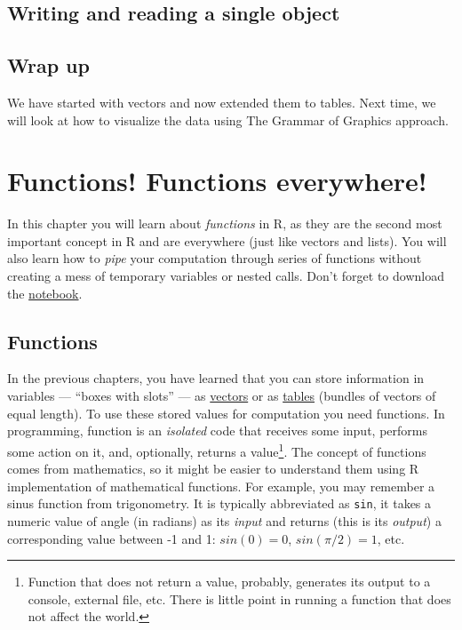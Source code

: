 \documentclass[
]{book}
\begin{document}
\hypertarget{rds}{%
\section{Writing and reading a single object}\label{rds}}

\hypertarget{wrap-up-1}{%
\section{Wrap up}\label{wrap-up-1}}

We have started with vectors and now extended them to tables. Next time, we will look at how to visualize the data using The Grammar of Graphics approach.

\hypertarget{functions}{%
\chapter{Functions! Functions everywhere!}\label{functions}}

In this chapter you will learn about \emph{functions} in R, as they are the second most important concept in R and are everywhere (just like vectors and lists). You will also learn how to \emph{pipe} your computation through series of functions without creating a mess of temporary variables or nested calls. Don't forget to download the \href{notebooks/Seminar\%2004\%20-\%20functions.Rmd}{notebook}.

\hypertarget{functions-1}{%
\section{Functions}\label{functions-1}}

In the previous chapters, you have learned that you can store information in variables --- ``boxes with slots'' --- as \protect\hyperlink{vectors}{vectors} or as \protect\hyperlink{tables}{tables} (bundles of vectors of equal length). To use these stored values for computation you need functions. In programming, function is an \emph{isolated} code that receives some input, performs some action on it, and, optionally, returns a value\footnote{Function that does not return a value, probably, generates its output to a console, external file, etc. There is little point in running a function that does not affect the world.}. The concept of functions comes from mathematics, so it might be easier to understand them using R implementation of mathematical functions. For example, you may remember a sinus function from trigonometry. It is typically abbreviated as \texttt{sin}, it takes a numeric value of angle (in radians) as its \emph{input} and returns (this is its \emph{output}) a corresponding value between -1 and 1: \(sin(0) = 0\), \(sin(\pi/2) = 1\), etc.
\end{document}
